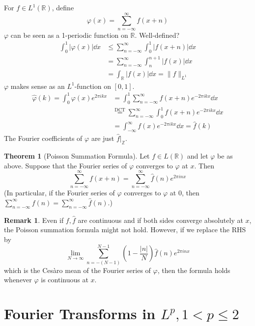 \documentclass{article}
\theoremstyle{definition}
\newtheorem{thm}{Theorem}
\newtheorem{rem}{Remark}
\newcommand{\RR}{\mathbb R}
\newcommand{\ZZ}{\mathbb Z}
\begin{document}
For $f \in L^1(\RR)$, define 
\[
	\varphi(x) = \sum_{n = -\infty}^\infty f(x + n)
\]
$\varphi$ can be seen as a 1-periodic function on $\RR$.
Well-defined?
\[
	\begin{split}
		\int_0^1 |\varphi(x)| \dd{x} &\leq \sum_{n = -\infty}^\infty \int_0^1 |f(x + n)| \dd{x}\\
		&= \sum_{n = -\infty}^\infty \int_n^{n + 1} |f(x)| \dd{x}\\
		&= \int_{\RR} |f(x)| \dd{x} = \|f\|_{L^1}
	\end{split}
\]
$\varphi$ makes sense as an $L^1$-function on $[0, 1]$.
\[
	\begin{split}
		\widehat{\varphi}(k) = \int_0^1 \varphi(x) e^{2 \pi i k x} &= \int_0^1 \sum_{n = -\infty}^\infty f(x + n) e^{-2 \pi i k x} \dd{x}\\
		&\stackrel{\text{DCT}}{=} \sum_{n = -\infty}^\infty \int_0^1 f(x + n) e^{- 2 \pi i k x} \dd{x}\\
		&= \int_{- \infty}^\infty f(x) e^{-2 \pi i k x} \dd{x} = \widehat{f}(k)
	\end{split}
\]
The Fourier coefficients of $\varphi$ are just $\widehat{f}|_{\ZZ}$.

\begin{thm}[Poisson Summation Formula]
	Let $f \in L(\RR)$ and let $\varphi$ be as above.
	Suppose that the Fourier series of $\varphi$ converges to $\varphi$ at $x$.
	Then
	\[
		\sum_{n = -\infty}^\infty f(x + n) = \sum_{n = -\infty}^\infty \widehat{f}(n) e^{2 \pi i n x}
	\]
	(In particular, if the Fourier series of $\varphi$ converges to $\varphi$ at 0, then $\sum_{n = -\infty}^\infty f(n) = \sum_{n = -\infty}^\infty \widehat{f}(n)$.)
\end{thm}

\begin{rem}
	Even if $f, \widehat{f}$ are continuous and if both sides converge absolutely at $x$, the Poisson summation formula might not hold.
	However, if we replace the RHS by
	\[
		\lim_{N \to \infty} \sum_{n = -(N - 1)}^{N - 1} \left( 1 - \frac{|n|}{N} \right) \widehat{f}(n) e^{2 \pi i n x}
	\]
	which is the Ces\`aro mean of the Fourier series of $\varphi$, then the formula holds whenever $\varphi$ is continuous at $x$.
\end{rem}

\section{Fourier Transforms in $L^p, 1 < p \leq 2$}
\end{document}
